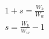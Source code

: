 \documentclass[a4paper,10pt]{article}
\begin{document}
\begin{equation}
    \begin{array}{l}
    \begin{split}
    1+s =\frac{W_b}{W_w} \\
    s = \frac{W_b}{W_w}-1
    \end{split}
    \end{array}
\end{equation}
\end{document}
